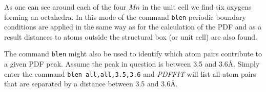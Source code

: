 \noindent As one can see around each of the four $Mn$ in the unit
cell we find six oxygens forming an octahedra. In this mode of the
command {\tt blen} periodic boundary conditions are applied in the
same way as for the calculation of the PDF and as a result
distances to atoms outside the structural box (or unit cell) are
also found.
\par

The command {\tt blen} might also be used to identify which atom
pairs contribute to a given PDF peak. Assume the peak in question
is between 3.5 and 3.6\AA. Simply enter the command {\tt blen
all,all,3.5,3.6} and {\it PDFFIT} will list all atom pairs that
are separated by a distance between 3.5 and 3.6\AA.

